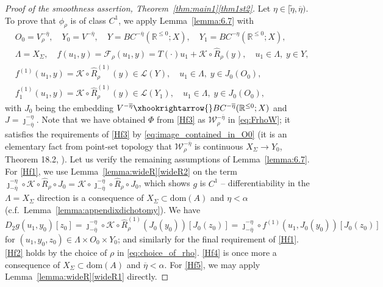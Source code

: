 \documentclass[a4paper, 12pt, oneside, reqno, notitlepage]{amsart}
\theoremstyle{plain}
\theoremstyle{definition}
\theoremstyle{remark}
\newcommand{\dom}{\mathrm{dom}}
\begin{document}
\begin{proof}[Proof of the smoothness assertion, Theorem~\ref{thm:main1}\ref{thm1st2}]
Let $\eta \in [\tilde{\eta},\overline{\eta})$.
To prove that $\phi_\rho$ is of class $C^1$, we apply Lemma~\ref{lemma:6.7} with
\begin{align*}
    &O_0 = V_\rho^{-\overline{\eta}}, \quad Y_0 = V^{-\overline{\eta}}, \quad Y = BC^{-\overline\eta}(\mathbb{R}^{\leq 0};X), \quad  Y_1 =  BC^{-\eta}(\mathbb{R}^{\leq 0};X), \\
    &\Lambda = X_\Sigma, \quad f(u_1,y) = \mathcal{F}_\rho(u_1,y) =T(\cdot)u_1 + \mathcal{K} \circ \widehat{R}_\rho(y), \quad u_1 \in \Lambda, \; y \in Y,\\
    & f^{(1)}(u_1,y) = \mathcal{K} \circ \widehat{R}^{(1)}_\rho(y) \in \mathcal{L}(Y) , \quad u_1 \in \Lambda, \; y \in J_0(O_0), \\
    & f^{(1)}_1(u_1,y) = \mathcal{K} \circ \widehat{R}^{(1)}_\rho(y) \in \mathcal{L}(Y_1), \quad u_1 \in \Lambda, \; y \in J_0(O_0), 
\end{align*}
with $J_0 $ being the embedding $V^{-\overline{\eta}} \xhookrightarrow{} BC^{-\overline\eta}(\mathbb{R}^{\leq 0};X)$ and $J = \jmath_{-\overline{\eta}}^{-\eta}$.
Note that we have obtained $\Phi$ from \ref{Hf3} as $\mathcal{W}_\rho^{-\overline{\eta}}$ in \eqref{eq:FrhoW}; it satisfies the requirements of \ref{Hf3} by \eqref{eq:image_contained_in_O0} (it is an elementary fact from point-set topology that $\mathcal{W}_\rho^{-\overline{\eta}}$ is continuous $X_\Sigma \to Y_0$, Theorem 18.2, \cite{munkres2000topology}). 
Let us verify the remaining assumptions of Lemma~\ref{lemma:6.7}.
For \ref{Hf1}, we use Lemma~\ref{lemma:wideR}\ref{wideR2} on the term $ \jmath_{-\overline{\eta}}^{-\eta} \circ \mathcal{K} \circ \widehat{R}_\rho \circ J_0 = \mathcal{K} \circ \jmath_{-\overline{\eta}}^{-\eta} \circ \widehat{R}_\rho \circ J_0$, which shows $g$ is $C^1$ -- differentiability in the $\Lambda = X_\Sigma$ direction is a consequence of $X_\Sigma \subset \dom(A)$ and $\eta < \alpha$ (c.f.\ Lemma~\ref{lemma:appendixdichotomy}).
We have
\begin{displaymath}
    D_2g (u_1,y_0)[z_0] =  \jmath_{-\overline{\eta}}^{-\eta} \circ \mathcal{K} \circ \widehat{R}_\rho^{(1)}(J_0(y_0))[ J_0(z_0)] = \jmath_{-\overline{\eta}}^{-\eta} \circ  f^{(1)}(u_1,J_0(y_0))[ J_0(z_0)]
\end{displaymath}
for $(u_1,y_0,z_0) \in \Lambda \times O_0 \times Y_0$; and similarly for the final requirement of \ref{Hf1}.
\ref{Hf2} holds by the choice of $\rho$ in \eqref{eq:choice_of_rho}.
\ref{Hf4} is once more a consequence of $X_\Sigma \subset \dom(A)$ and $\overline{\eta} < \alpha$.
For \ref{Hf5}, we may apply Lemma~\ref{lemma:wideR}\ref{wideR1} directly.


\end{proof}
\end{document}
